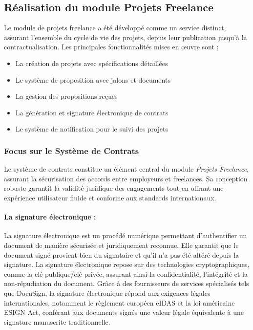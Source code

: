 \subsection{Réalisation du module Projets Freelance}
Le module de projets freelance a été développé comme un service distinct, assurant l'ensemble du cycle de vie des projets, depuis leur publication jusqu'à la contractualisation. Les principales fonctionnalités mises en œuvre sont :
\begin{itemize}
    \item La création de projets avec spécifications détaillées
    \item Le système de proposition avec jalons et documents
    \item La gestion des propositions reçues
    \item La génération et signature électronique de contrats
    \item Le système de notification pour le suivi des projets
\end{itemize}

\subsubsection{Focus sur le Système de Contrats}

Le système de contrats constitue un élément central du module \textit{Projets Freelance}, assurant la sécurisation des accords entre employeurs et freelances. Sa conception robuste garantit la validité juridique des engagements tout en offrant une expérience utilisateur fluide et conforme aux standards internationaux.

\paragraph{La signature électronique :}

La signature électronique est un procédé numérique permettant d'authentifier un document de manière sécurisée et juridiquement reconnue. Elle garantit que le document signé provient bien du signataire et qu'il n'a pas été altéré depuis la signature. La signature électronique repose sur des technologies cryptographiques, comme la clé publique/clé privée, assurant ainsi la confidentialité, l'intégrité et la non-répudiation du document. Grâce à des fournisseurs de services spécialisés tels que DocuSign, la signature électronique répond aux exigences légales internationales, notamment le règlement européen eIDAS et la loi américaine ESIGN Act, conférant aux documents signés une valeur légale équivalente à une signature manuscrite traditionnelle.

